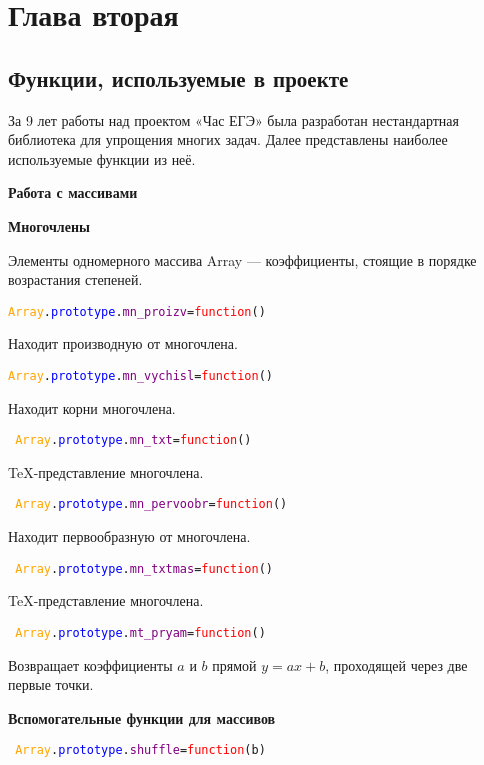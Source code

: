 \section{Глава вторая}\label{2sect}
\subsection{Функции, используемые в проекте}
За 9 лет работы над проектом «Час ЕГЭ» была разработан нестандартная библиотека для упрощения многих задач. Далее представлены наиболее используемые функции из неё.

\textbf{Работа с массивами}

\textbf{Многочлены}

Элементы одномерного массива Array --- коэффициенты, стоящие в порядке возрастания степеней.

\texttt{\textcolor{Orange}{Array}.\textcolor{Blue}{prototype}.\textcolor{Purple}{mn\_proizv}=\textcolor{Red}{function}()}

Находит производную от многочлена.

\texttt{\textcolor{Orange}{Array}.\textcolor{Blue}{prototype}.\textcolor{Purple}{mn\_vychisl}=\textcolor{Red}{function}()
}

Находит корни многочлена.

\texttt{
	\textcolor{Orange}{Array}.\textcolor{Blue}{prototype}.\textcolor{Purple}{mn\_txt}=\textcolor{Red}{function}()}

TeX-представление многочлена.%

\texttt{
	\textcolor{Orange}{Array}.\textcolor{Blue}{prototype}.\textcolor{Purple}{mn\_pervoobr}=\textcolor{Red}{function}()
}

Находит первообразную от многочлена.%

\texttt{
	\textcolor{Orange}{Array}.\textcolor{Blue}{prototype}.\textcolor{Purple}{mn\_txtmas}=\textcolor{Red}{function}()
}

TeX-представление многочлена.

\texttt{
	\textcolor{Orange}{Array}.\textcolor{Blue}{prototype}.\textcolor{Purple}{mt\_pryam}=\textcolor{Red}{function}()
}

Возвращает коэффициенты $a$ и $b$ прямой $y=ax+b$, проходящей через две первые точки.

\textbf{Вспомогательные функции для массивов}

\texttt{
	\textcolor{Orange}{Array}.\textcolor{Blue}{prototype}.\textcolor{Purple}{shuffle}=\textcolor{Red}{function}(b)
}

